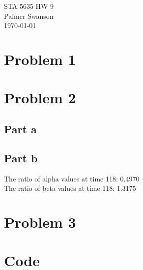 \documentclass[12pt]{article}
\newcommand{\doctitle}{STA 5635 HW 9}
\newcommand{\name}{Palmer Swanson}
\newcommand{\docdate}{\today}
\begin{document}
\begin{center}
    {\Large \doctitle}\\[6pt]
    {\name}\\[3pt]
    {\docdate}
\end{center}
\vspace{12pt}

\section*{Problem 1}
\begin{table}[htbp]
        \centering
        
        \caption{Minimized x and y values for the three expressions, as well as the values of the expressions.}
        \label{tab:table_problem_1}
\end{table}


\section*{Problem 2}
\subsection*{Part a}




\subsection*{Part b}
The ratio of alpha values at time 118: 0.4970\\
The ratio of beta values at time 118: 1.3175

\section*{Problem 3}




\newpage
\newpage
\appendix
\section*{Code}

\end{document}

